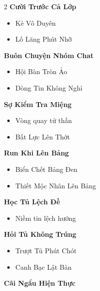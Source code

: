 \begin{multicols}{2}
\vspace{0.8em}
\textbf{\color{chapterline}Cười Trước Cả Lớp}
\begin{itemize}[leftmargin=1.2em, itemsep=0.1em, label=\textcolor{titlecolor}{\tiny$\blacksquare$}]
  \item Kẻ Vô Duyên
  \item Lố Lăng Phút Nhỡ
\end{itemize}
\vspace{0.8em}
\textbf{\color{chapterline}Buôn Chuyện Nhóm Chat}
\begin{itemize}[leftmargin=1.2em, itemsep=0.1em, label=\textcolor{titlecolor}{\tiny$\blacksquare$}]
  \item Hội Bàn Tròn Ảo
  \item Dòng Tin Không Nghỉ
\end{itemize}
\vspace{0.8em}
\textbf{\color{chapterline}Sợ Kiểm Tra Miệng}
\begin{itemize}[leftmargin=1.2em, itemsep=0.1em, label=\textcolor{titlecolor}{\tiny$\blacksquare$}]
  \item Vòng quay tử thần
  \item Bất Lực Lên Thớt
\end{itemize}
\vspace{0.8em}
\textbf{\color{chapterline}Run Khi Lên Bảng}
\begin{itemize}[leftmargin=1.2em, itemsep=0.1em, label=\textcolor{titlecolor}{\tiny$\blacksquare$}]
  \item Biển Chết Bảng Đen
  \item Thiết Mộc Nhân Lên Bảng
\end{itemize}
\vspace{0.8em}
\textbf{\color{chapterline}Học Tủ Lệch Đề}
\begin{itemize}[leftmargin=1.2em, itemsep=0.1em, label=\textcolor{titlecolor}{\tiny$\blacksquare$}]
  \item Niềm tin lệch hướng
\end{itemize}
\vspace{0.8em}
\textbf{\color{chapterline}Hỏi Tủ Không Trúng}
\begin{itemize}[leftmargin=1.2em, itemsep=0.1em, label=\textcolor{titlecolor}{\tiny$\blacksquare$}]
  \item Trượt Tủ Phút Chót
  \item Canh Bạc Lật Bàn
\end{itemize}
\vspace{0.8em}
\textbf{\color{chapterline}Cãi Ngẩu Hiện Thực}

\end{multicols}
